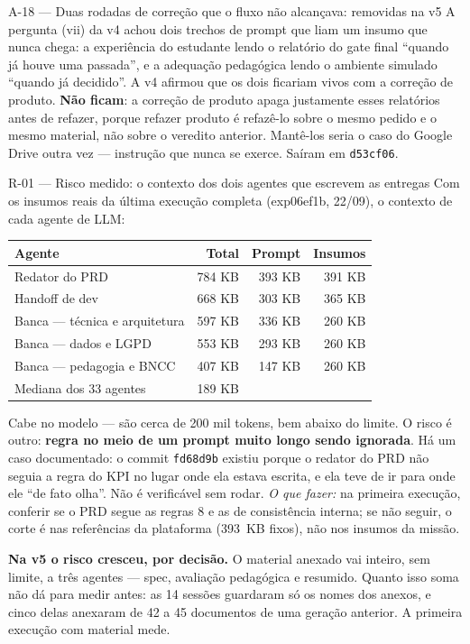 \documentclass[11pt,a4paper]{article}
\begin{document}
\begin{ressalvabox}{A-18 --- Duas rodadas de correção que o fluxo não alcançava: removidas na v5}
A pergunta (vii) da v4 achou dois trechos de prompt que liam um insumo que nunca chega: a experiência do estudante lendo o relatório do gate final ``quando já houve uma passada'', e a adequação pedagógica lendo o ambiente simulado ``quando já decidido''. A v4 afirmou que os dois ficariam vivos com a correção de produto. \textbf{Não ficam}: a correção de produto apaga justamente esses relatórios antes de refazer, porque refazer produto é refazê-lo sobre o mesmo pedido e o mesmo material, não sobre o veredito anterior. Mantê-los seria o caso do Google Drive outra vez --- instrução que nunca se exerce. Saíram em \texttt{d53cf06}.
\end{ressalvabox}

\begin{ressalvabox}{R-01 --- Risco medido: o contexto dos dois agentes que escrevem as entregas}
Com os insumos reais da última execução completa (exp06ef1b, 22/09), o contexto de cada agente de LLM:

\begin{center}
\small
\begin{tabular}{@{}lrrr@{}}
\toprule
\textbf{Agente} & \textbf{Total} & \textbf{Prompt} & \textbf{Insumos} \\
\midrule
Redator do PRD & 784 KB & 393 KB & 391 KB \\
Handoff de dev & 668 KB & 303 KB & 365 KB \\
Banca --- técnica e arquitetura & 597 KB & 336 KB & 260 KB \\
Banca --- dados e LGPD & 553 KB & 293 KB & 260 KB \\
Banca --- pedagogia e BNCC & 407 KB & 147 KB & 260 KB \\
\midrule
Mediana dos 33 agentes & 189 KB & & \\
\bottomrule
\end{tabular}
\end{center}

Cabe no modelo --- são cerca de 200 mil tokens, bem abaixo do limite. O risco é outro: \textbf{regra no meio de um prompt muito longo sendo ignorada}. Há um caso documentado: o commit \texttt{fd68d9b} existiu porque o redator do PRD não seguia a regra do KPI no lugar onde ela estava escrita, e ela teve de ir para onde ele ``de fato olha''. Não é verificável sem rodar. \emph{O que fazer:} na primeira execução, conferir se o PRD segue as regras 8 e as de consistência interna; se não seguir, o corte é nas referências da plataforma (393~KB fixos), não nos insumos da missão.

\textbf{Na v5 o risco cresceu, por decisão.} O material anexado vai inteiro, sem limite, a três agentes --- spec, avaliação pedagógica e resumido. Quanto isso soma não dá para medir antes: as 14 sessões guardaram só os nomes dos anexos, e cinco delas anexaram de 42 a 45 documentos de uma geração anterior. A primeira execução com material mede.
\end{ressalvabox}
\end{document}
